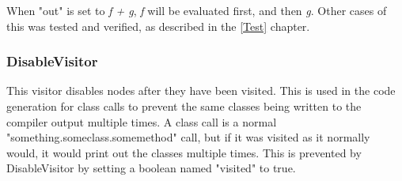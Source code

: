 When "out" is set to \textit{f + g}, \textit{f} will be evaluated first, and then \textit{g}. Other cases of this was tested and verified, as described in the \ref{Test} chapter.

\subsubsection{DisableVisitor}
This visitor disables nodes after they have been visited. This is used in the code generation for class calls to prevent the same classes being written to the compiler output multiple times. A class call is a normal "something.someclass.somemethod" call, but if it was visited as it normally would, it would print out the classes multiple times. This is prevented by DisableVisitor by setting a boolean named "visited" to true. 
